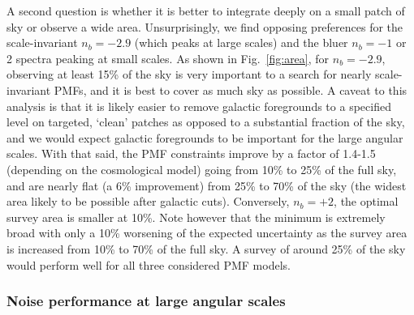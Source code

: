 \documentclass[apj]{emulateapj}
\begin{document}
A second question is whether it is better to integrate deeply on a small patch of sky or observe a wide area. 
Unsurprisingly, we find opposing preferences for the scale-invariant $n_b=-2.9$ (which peaks at large scales) and the bluer $n_b=-1$ or 2 spectra peaking at small scales. 
As shown in  Fig.~\ref{fig:area}, for $n_b=-2.9$, observing at least 15\% of the sky is very important to a search for nearly scale-invariant PMFs, and it is best  to cover as much sky as possible. 
A caveat to this analysis is that it is likely easier to remove galactic foregrounds to a specified level on targeted, `clean' patches as opposed to a substantial fraction of the sky, and we would expect galactic foregrounds to be important for the large angular scales. 
With that said, the PMF constraints improve by a factor of 1.4-1.5 (depending on the cosmological model) going from 10\% to 25\% of the full sky, and are nearly flat (a 6\% improvement) from 25\% to 70\% of the sky (the widest area likely to be possible after galactic cuts).
Conversely, $n_b=+2$, the optimal survey area is smaller at 10\%. 
Note however that the minimum is extremely broad with only a 10\% worsening of the expected uncertainty as the survey area is increased from 10\% to 70\% of the  full sky. 
A survey of around 25\% of the sky would perform well for all three considered PMF models. 

\subsubsection{Noise performance at large angular scales}
\end{document}
